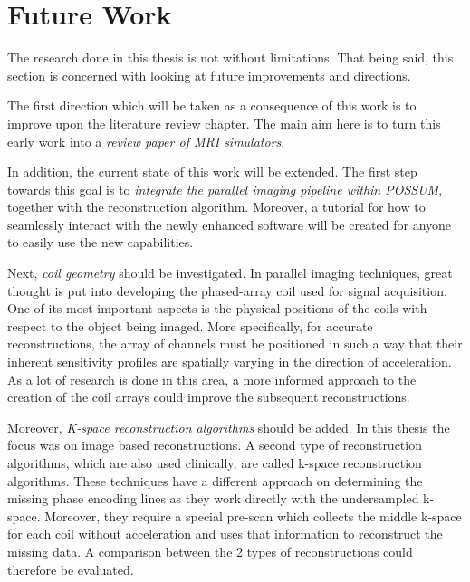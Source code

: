 \section{Future Work}
The research done in this thesis is not without limitations. That being said, this section is concerned with looking at future improvements and directions.

The first direction which will be taken as a consequence of this work is to improve upon the literature review chapter. The main aim here is to turn this early work into a \textit{review paper of MRI simulators}.

In addition, the current state of this work will be extended. The first step towards this goal is to \textit{integrate the parallel imaging pipeline within POSSUM}, together with the reconstruction algorithm. Moreover, a tutorial for how to seamlessly interact with the newly enhanced software will be created for anyone to easily use the new capabilities.

Next, \textit{coil geometry} should be investigated. In parallel imaging techniques, great thought is put into developing the phased-array coil used for signal acquisition. One of its most important aspects is the physical positions of the coils with respect to the object being imaged. More specifically, for accurate reconstructions, the array of channels must be positioned in such a way that their inherent sensitivity profiles are spatially varying in the direction of acceleration. As a lot of research is done in this area, a more informed approach to the creation of the coil arrays could improve the subsequent reconstructions.


Moreover, \textit{K-space reconstruction algorithms} should be added. In this thesis the focus was on image based reconstructions. A second type of reconstruction algorithms, which are also used clinically, are called k-space reconstruction algorithms. These techniques have a different approach on determining the missing phase encoding lines as they work directly with the undersampled k-space. Moreover, they require a special pre-scan which collects the middle k-space for each coil without acceleration and uses that information to reconstruct the missing data. A comparison between the 2 types of reconstructions could therefore be evaluated.

